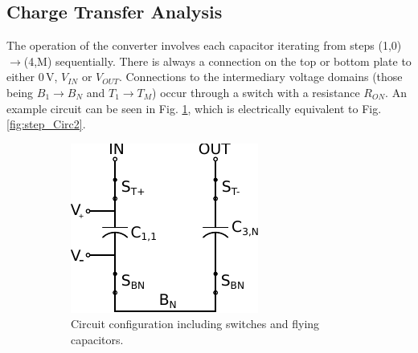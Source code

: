 \documentclass[conference]{IEEEtran}
\begin{document}
	\subsection{Charge Transfer Analysis}
	The operation of the converter involves each capacitor iterating from steps (1,0)$\rightarrow$(4,M) sequentially. There is always a connection on the top or bottom plate to either 0$\,$V, $V_{IN}$ or $V_{OUT}$. Connections to the intermediary voltage domains (those being $B_1 \rightarrow B_N$ and $T_1 \rightarrow T_M$) occur through a switch with a resistance $R_{ON}$. An example circuit can be seen in Fig. \ref{fig:step_Circ1}, which is electrically equivalent to Fig. \ref{fig:step_Circ2}. 
	
	\begin{figure}
		\centering
		\begin{subfigure}{0.45\linewidth}
			\centering
			\includegraphics[width=\textwidth]{Figures/step2_Circ.pdf}
			\caption{Circuit configuration including switches and flying capacitors.}
			\label{fig:step_Circ1}
		\end{subfigure}
		\hfill
		\begin{subfigure}{0.45\linewidth}
			\centering

\end{subfigure}
\end{figure}
\end{document}
